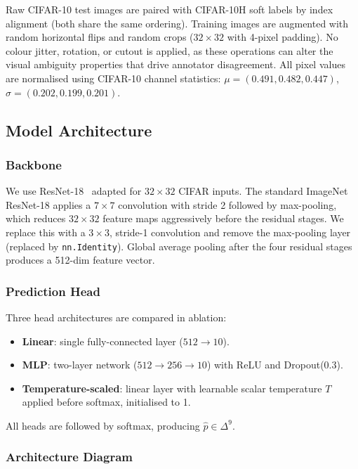 \documentclass[11pt,a4paper]{article}
\begin{document}
Raw CIFAR-10 test images are paired with CIFAR-10H soft labels by index
alignment (both share the same ordering).
Training images are augmented with random horizontal flips and random crops
($32{\times}32$ with 4-pixel padding).
No colour jitter, rotation, or cutout is applied, as these operations can
alter the visual ambiguity properties that drive annotator disagreement.
All pixel values are normalised using CIFAR-10 channel statistics:
$\mu = (0.491, 0.482, 0.447)$, $\sigma = (0.202, 0.199, 0.201)$.

\subsection{Model Architecture}

\subsubsection{Backbone}

We use ResNet-18~\cite{he2016deep} adapted for $32{\times}32$ CIFAR inputs.
The standard ImageNet ResNet-18 applies a $7{\times}7$ convolution with
stride 2 followed by max-pooling, which reduces $32{\times}32$ feature maps
aggressively before the residual stages.
We replace this with a $3{\times}3$, stride-1 convolution and remove the
max-pooling layer (replaced by \texttt{nn.Identity}).
Global average pooling after the four residual stages produces a 512-dim
feature vector.

\subsubsection{Prediction Head}

Three head architectures are compared in ablation:
\begin{itemize}[noitemsep]
  \item \textbf{Linear}: single fully-connected layer ($512 \to 10$).
  \item \textbf{MLP}: two-layer network ($512 \to 256 \to 10$) with ReLU
        and Dropout(0.3).
  \item \textbf{Temperature-scaled}: linear layer with learnable scalar
        temperature $T$ applied before softmax, initialised to 1.
\end{itemize}
All heads are followed by softmax, producing $\hat{p} \in \Delta^9$.

\subsubsection{Architecture Diagram}
\end{document}

